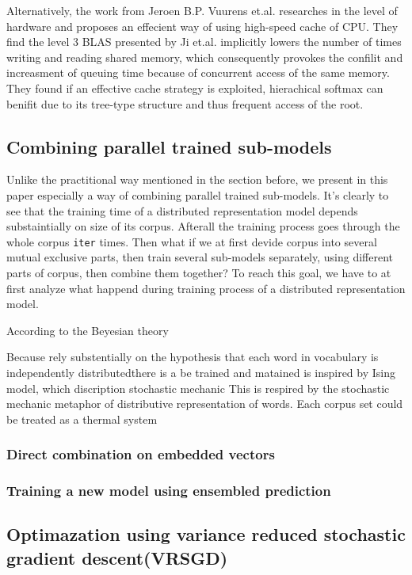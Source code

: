 \documentclass[11pt,a4paper]{article}
\begin{document}
  Alternatively, the work from Jeroen B.P. Vuurens et.al. \cite{eickhoff2016efficient} researches in the level of hardware and proposes an effecient way of using high-speed cache of CPU. They find the level 3 BLAS presented by Ji et.al. implicitly lowers the number of times writing and reading shared memory, which consequently provokes the confilit and increasment of queuing time because of concurrent access of the same memory. They found if an effective cache strategy is exploited, hierachical softmax can benifit due to its tree-type structure and  thus frequent access of the root.

  \subsection{Combining parallel trained sub-models}
  Unlike the practitional way mentioned in the section before, we present in this paper especially a way of combining parallel trained sub-models. It's clearly to see that the training time of a distributed representation model depends substaintially on size of its corpus. Afterall the training process goes through the whole corpus \verb|iter| times. Then what if we at first devide corpus into several mutual exclusive parts, then train several sub-models separately, using different parts of corpus, then combine them together? To reach this goal, we have to at first analyze what happend during training process of a distributed representation model.

According to the Beyesian theory


Because  rely substentially on the hypothesis that each word in vocabulary is independently distributedthere is a be trained and matained is inspired by Ising model, which discription stochastic mechanic This is respired by the stochastic mechanic metaphor of distributive representation of words. Each corpus set could be treated as a thermal system 
\subsubsection{Direct combination on embedded vectors}
\subsubsection{Training a new model using ensembled prediction}

\subsection{Optimazation using variance reduced stochastic gradient descent(VRSGD)}
\end{document}
